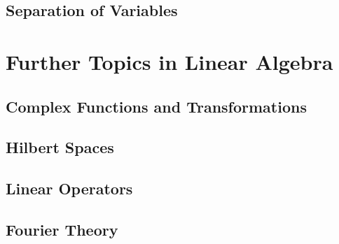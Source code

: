 \documentclass[12pt,letterpaper, openany]{book} %
\begin{document}
\chapter{Separation of Variables}


\part{Further Topics in Linear Algebra}



\chapter{Complex Functions and Transformations}
 

\chapter{Hilbert Spaces}


\chapter{Linear Operators}


\chapter{Fourier Theory}




%


 
\newenvironment{changemargin}[1]{%
\begin{list}{}{%
\setlength{\topsep}{#1}
\setlength{\listparindent}{\parindent}%
\setlength{\itemindent}{\parindent}%
\setlength{\parsep}{\parskip}%
}%
\item[]}{\end{list}}

\begin{changemargin}{0cm}
\printindex 
\end{changemargin}

 
\end{document}
